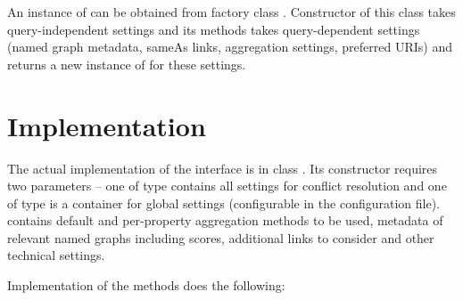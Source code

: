 An instance of  can be obtained from factory class . Constructor of this class takes query-independent settings and its  methods takes query-dependent settings (named graph metadata, sameAs links, aggregation settings, preferred URIs) and returns a new instance of  for these settings.

\section{Implementation}
The actual implementation of the  interface is in class . Its constructor requires two parameters -- one of type  contains all settings for conflict resolution and one of type  is a container for global settings (configurable in the \odcs configuration file).  contains default and per-property aggregation methods to be used, metadata of relevant named graphs including \QA scores, additional  links to consider and other technical settings.

Implementation of the  methods does the following:

